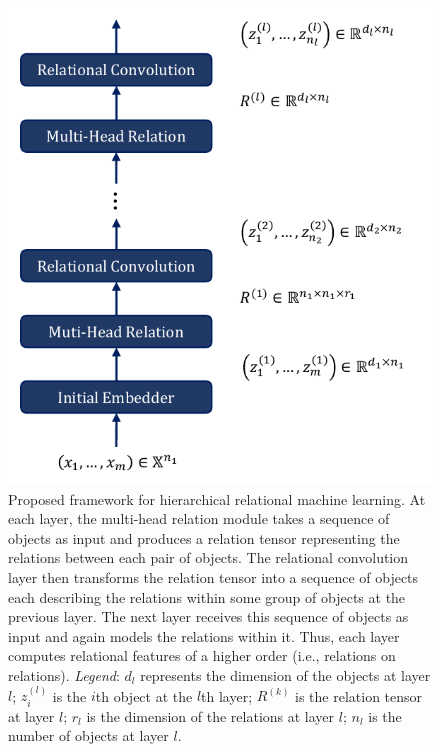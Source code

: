 \begin{figure}[!ht]
    \centering
    \includegraphics[width=.5\textwidth]{figs/relconv_architecture.pdf}
    \caption{Proposed framework for hierarchical relational machine learning. At each layer, the multi-head relation module takes a sequence of objects as input and produces a relation tensor representing the relations between each pair of objects. The relational convolution layer then transforms the relation tensor into a sequence of objects each describing the relations within some group of objects at the previous layer. The next layer receives this sequence of objects as input and again models the relations within it. Thus, each layer computes relational features of a higher order (i.e., relations on relations). \textit{Legend}: $d_l$ represents the dimension of the objects at layer $l$; $z_i^{(l)}$ is the $i$th object at the $l$th layer; $R^{(k)}$ is the relation tensor at layer $l$; $r_l$ is the dimension of the relations at layer $l$; $n_l$ is the number of objects at layer $l$.}\label{fig:relconv_architecture}
\end{figure}